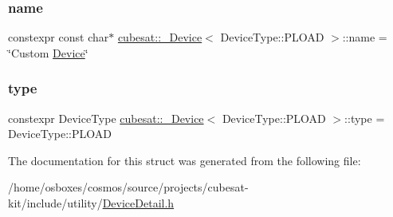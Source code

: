 \subsubsection{\texorpdfstring{name}{name}}
{\footnotesize\ttfamily constexpr const char$\ast$ \hyperlink{structcubesat_1_1__Device}{cubesat\+::\+\_\+\+Device}$<$ Device\+Type\+::\+P\+L\+O\+AD $>$\+::name = \char`\"{}Custom \hyperlink{classcubesat_1_1Device}{Device}\char`\"{}\hspace{0.3cm}{\ttfamily [static]}}

\mbox{\label{structcubesat_1_1__Device_3_01DeviceType_1_1PLOAD_01_4_a69eec0aaebcde656b579781fde78f1cd}} 
\subsubsection{\texorpdfstring{type}{type}}
{\footnotesize\ttfamily constexpr Device\+Type \hyperlink{structcubesat_1_1__Device}{cubesat\+::\+\_\+\+Device}$<$ Device\+Type\+::\+P\+L\+O\+AD $>$\+::type = Device\+Type\+::\+P\+L\+O\+AD\hspace{0.3cm}{\ttfamily [static]}}



The documentation for this struct was generated from the following file\+:\begin{DoxyCompactItemize}
\item 
/home/osboxes/cosmos/source/projects/cubesat-\/kit/include/utility/\hyperlink{DeviceDetail_8h}{Device\+Detail.\+h}\end{DoxyCompactItemize}
